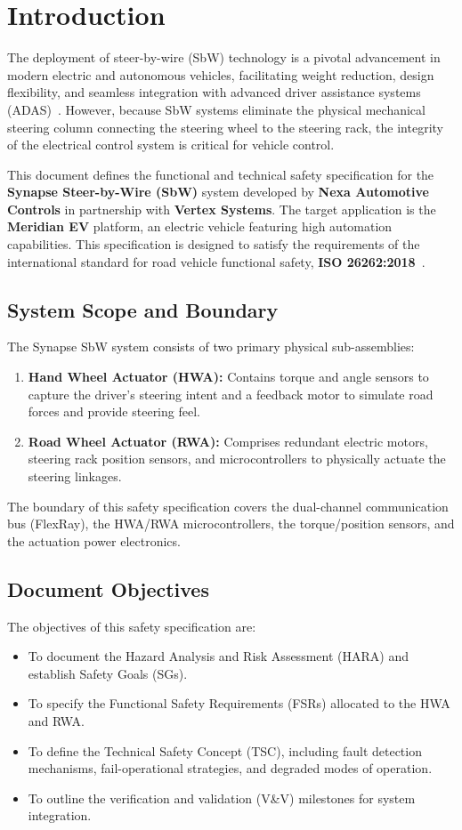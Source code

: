 \section{Introduction}
\label{sec:introduction}

The deployment of steer-by-wire (SbW) technology is a pivotal advancement in modern electric and autonomous vehicles, facilitating weight reduction, design flexibility, and seamless integration with advanced driver assistance systems (ADAS)~\cite{MeridianSafety2024}. However, because SbW systems eliminate the physical mechanical steering column connecting the steering wheel to the steering rack, the integrity of the electrical control system is critical for vehicle control. 

This document defines the functional and technical safety specification for the \textbf{Synapse Steer-by-Wire (SbW)} system developed by \textbf{Nexa Automotive Controls} in partnership with \textbf{Vertex Systems}. The target application is the \textbf{Meridian EV} platform, an electric vehicle featuring high automation capabilities. This specification is designed to satisfy the requirements of the international standard for road vehicle functional safety, \textbf{ISO 26262:2018}~\cite{ISO26262_2018}.

\subsection{System Scope and Boundary}
The Synapse SbW system consists of two primary physical sub-assemblies:
\begin{enumerate}
    \item \textbf{Hand Wheel Actuator (HWA):} Contains torque and angle sensors to capture the driver's steering intent and a feedback motor to simulate road forces and provide steering feel.
    \item \textbf{Road Wheel Actuator (RWA):} Comprises redundant electric motors, steering rack position sensors, and microcontrollers to physically actuate the steering linkages.
\end{enumerate}
The boundary of this safety specification covers the dual-channel communication bus (FlexRay), the HWA/RWA microcontrollers, the torque/position sensors, and the actuation power electronics.

\subsection{Document Objectives}
The objectives of this safety specification are:
\begin{itemize}
    \item To document the Hazard Analysis and Risk Assessment (HARA) and establish Safety Goals (SGs).
    \item To specify the Functional Safety Requirements (FSRs) allocated to the HWA and RWA.
    \item To define the Technical Safety Concept (TSC), including fault detection mechanisms, fail-operational strategies, and degraded modes of operation.
    \item To outline the verification and validation (V\&V) milestones for system integration.
\end{itemize}

